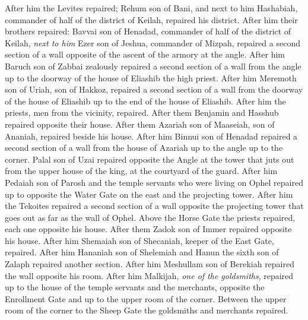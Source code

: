 \begin{biblechapter}
\verse After him the Levites repaired; Rehum son of Bani, and next to him Hashabiah, commander of half of the district of Keilah, repaired his district.
\verse After him their brothers repaired: Bavvai son of Henadad, commander of half of the district of Keilah,
\verse \textit{next to him} Ezer son of Jeshua, commander of Mizpah, repaired a second section of a wall opposite of the ascent of the armory at the angle.
\verse After him Baruch son of Zabbai zealously repaired a second section of a wall from the angle up to the doorway of the house of Eliashib the high priest.
\verse After him Meremoth son of Uriah, son of Hakkoz, repaired a second section of a wall from the doorway of the house of Eliashib up to the end of the house of Eliashib.
\verse After him the priests, men from the vicinity, repaired.
\verse After them Benjamin and Hasshub repaired opposite their house. After them Azariah son of Maaseiah, son of Ananiah, repaired beside his house.
\verse After him Binnui son of Henadad repaired a second section of a wall from the house of Azariah up to the angle up to the corner.
\verse Palal son of Uzai repaired opposite the Angle at the tower that juts out from the upper house of the king, at the courtyard of the guard. After him Pedaiah son of Parosh
\verse and the temple servants who were living on Ophel repaired up to opposite the Water Gate on the east and the projecting tower.
\verse After him the Tekoites repaired a second section of a wall opposite the projecting tower that goes out as far as the wall of Ophel.
\verse Above the Horse Gate the priests repaired, each one opposite his house.
\verse After them Zadok son of Immer repaired opposite his house. After him Shemaiah son of Shecaniah, keeper of the East Gate, repaired.
\verse After him Hananiah son of Shelemiah and Hanun the sixth son of Zalaph repaired another section. After him Meshullam son of Berekiah repaired the wall opposite his room.
\verse After him Malkijah, \textit{one of the goldsmiths}, repaired up to the house of the temple servants and the merchants, opposite the Enrollment Gate and up to the upper room of the corner.
\verse Between the upper room of the corner to the Sheep Gate the goldsmiths and merchants repaired.
\end{biblechapter}

